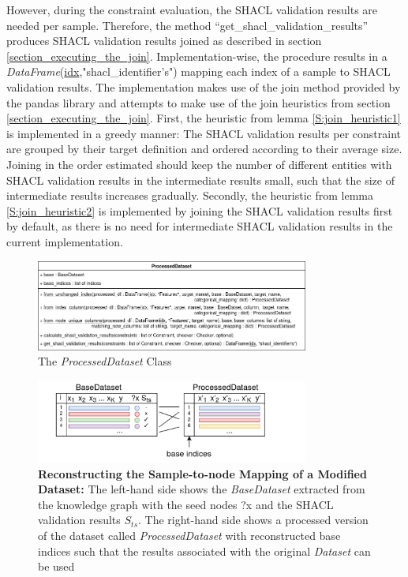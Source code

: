However, during the constraint evaluation, the SHACL validation results are needed per sample. Therefore, the method ``get\_shacl\_validation\_results'' produces SHACL validation results joined as described in section \ref{section_executing_the_join}. Implementation-wise, the procedure results in a \emph{DataFrame}(\underline{idx},"shacl\_identifier's") mapping each index of a sample to SHACL validation results. The implementation makes use of the join method provided by the pandas library and attempts to make use of the join heuristics from section \ref{section_executing_the_join}. First, the heuristic from lemma \ref{S:join_heuristic1} is implemented in a greedy manner: The SHACL validation results per constraint are grouped by their target definition and ordered according to their average size. Joining in the order estimated should keep the number of different entities with SHACL validation results in the intermediate results small, such that the size of intermediate results increases gradually.
Secondly, the heuristic from lemma \ref{S:join_heuristic2} is implemented by joining the SHACL validation results first by default, as there is no need for intermediate SHACL validation results in the current implementation.

\begin{figure}
    \centering
    \includegraphics[width=0.8\textwidth]{images/implementation/class_diagram_processed_dataset.png}
    \caption{The \emph{ProcessedDataset} Class}
    \label{fig:implementation_processed_dataset}
\end{figure}

\begin{figure}
    \centering
    \includegraphics[width=0.8\textwidth]{images/implementation/base_indicies.png}
    \caption{\textbf{Reconstructing the Sample-to-node Mapping of a Modified Dataset:} The left-hand side shows the \emph{BaseDataset} extracted from the knowledge graph with the seed nodes ?x and the SHACL validation results $S_{ts}$. The right-hand side shows a processed version of the dataset called \emph{ProcessedDataset} with reconstructed base indices such that the results associated with the original \emph{Dataset} can be used}
    \label{fig:base_indices_viz}
\end{figure}

